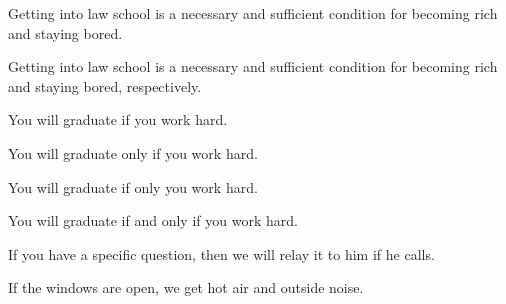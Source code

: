 \begin{enumerate}
	\begin{statement}{Getting into law school is a necessary and sufficient condition for becoming rich and staying bored.}
	\end{statement}

	\begin{statement}{Getting into law school is a necessary and sufficient condition for becoming rich and staying bored, respectively.}
	\end{statement}

	\begin{statement}{You will graduate if you work hard.}
	\end{statement}

	\begin{statement}{You will graduate only if you work hard.}
	\end{statement}

	\begin{statement}{You will graduate if only you work hard.}
	\end{statement}

	\begin{statement}{You will graduate if and only if you work hard.}
	\end{statement}

	\begin{statement}{If you have a specific question, then we will relay it to him if he calls.}
	\end{statement}

	\begin{statement}{If the windows are open, we get hot air and outside noise.}
	\end{statement}


\end{enumerate}
